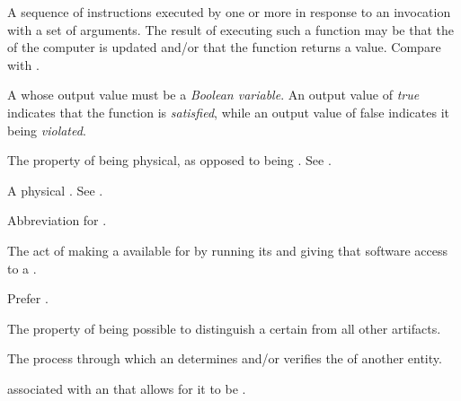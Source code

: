 {
A sequence of instructions executed by one or more  in response to an invocation with a set of arguments.
The result of executing such a function may be that the  of the computer is updated and/or that the function returns a value.
Compare with .

A  whose output value must be a \textit{Boolean variable}.
An output value of \textit{true} indicates that the function is \textit{satisfied}, while an output value of false indicates it being \textit{violated}.


The property of being physical, as opposed to being .
See .

A physical .
See .

Abbreviation for .

The act of making a  available for  by running its  and giving that software access to a .

Prefer .

The property of being possible to distinguish a certain  from all other artifacts.


The process through which an  determines and/or verifies the  of another entity. 

 associated with an  that allows for it to be .

}
